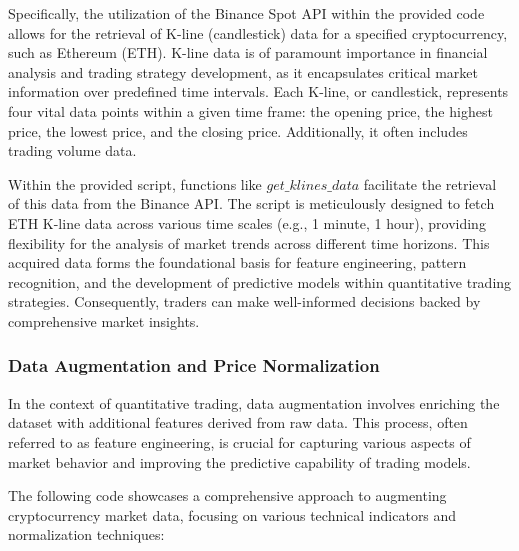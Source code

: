 \documentclass[10pt,twocolumn,letterpaper]{article}
\begin{document}
Specifically, the utilization of the Binance Spot API within the provided code allows for the retrieval of K-line (candlestick) data for a specified cryptocurrency, such as Ethereum (ETH). K-line data is of paramount importance in financial analysis and trading strategy development, as it encapsulates critical market information over predefined time intervals. Each K-line, or candlestick, represents four vital data points within a given time frame: the opening price, the highest price, the lowest price, and the closing price. Additionally, it often includes trading volume data.

Within the provided script, functions like $get\_klines\_data$ facilitate the retrieval of this data from the Binance API. The script is meticulously designed to fetch ETH K-line data across various time scales (e.g., 1 minute, 1 hour), providing flexibility for the analysis of market trends across different time horizons. This acquired data forms the foundational basis for feature engineering, pattern recognition, and the development of predictive models within quantitative trading strategies. Consequently, traders can make well-informed decisions backed by comprehensive market insights.


\subsubsection{Data Augmentation and Price Normalization}

In the context of quantitative trading, data augmentation involves enriching the dataset with additional features derived from raw data. This process, often referred to as feature engineering, is crucial for capturing various aspects of market behavior and improving the predictive capability of trading models.

The following code showcases a comprehensive approach to augmenting cryptocurrency market data, focusing on various technical indicators and normalization techniques:
\end{document}

